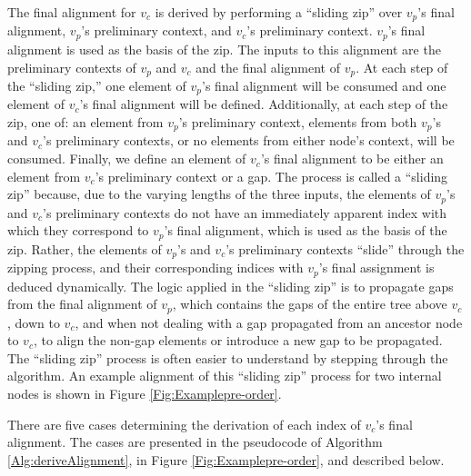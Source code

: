 \documentclass{bmcart}
\begin{document}
The final alignment for $v_c$ is derived by performing a ``sliding zip'' over $v_p$'s final alignment, $v_p$'s preliminary context, and $v_c$'s preliminary context.
$v_p$'s final alignment is used as the basis of the zip.
The inputs to this alignment are the preliminary contexts of $v_p$ and $v_c$ and the final alignment of $v_p$.
At each step of the ``sliding zip,'' one element of $v_p$'s final alignment will be consumed and one element of $v_c$'s final alignment will be defined.
Additionally, at each step of the zip, one of: an element from $v_p$'s preliminary context, elements from both $v_p$'s and $v_c$'s preliminary contexts, or no elements from either node's context, will be consumed.
Finally, we define an element of $v_c$'s final alignment to be either an element from $v_c$'s preliminary context or a gap.
The process is called a ``sliding zip'' because, due to the varying lengths of the three inputs, the elements of $v_p$'s and $v_c$'s preliminary contexts do not have an immediately apparent index with which they correspond to $v_p$'s final alignment, which is used as the basis of the zip.
Rather, the elements of $v_p$'s and $v_c$'s preliminary contexts ``slide'' through the zipping process, and their corresponding indices with $v_p$'s final assignment is deduced dynamically.
The logic applied in the ``sliding zip'' is to propagate gaps from the final alignment of $v_p$, which contains the gaps of the entire tree above $v_c$, down to $v_c$, and when not dealing with a gap propagated from an ancestor node to $v_c$, to align the non-gap elements or introduce a new gap to be propagated.
The ``sliding zip'' process is often easier to understand by stepping through the algorithm.
An example alignment of this ``sliding zip'' process for two internal nodes is shown in Figure \ref{Fig:Examplepre-order}.

There are five cases determining the derivation of each index of $v_c$'s final alignment.
The cases are presented in the pseudocode of Algorithm \ref{Alg:deriveAlignment}, in Figure \ref{Fig:Examplepre-order}, and described below.
\end{document}
